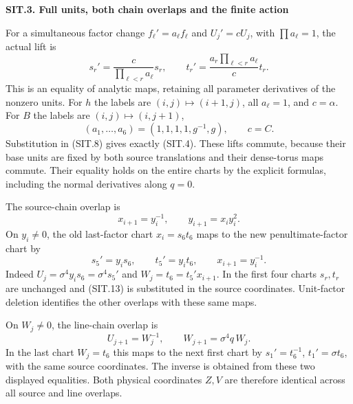 \par

\medskip\noindent\textbf{SIT.3. Full units, both chain overlaps and the finite action}

\par\nobreak

For a simultaneous factor change \(f_\ell'=a_\ell f_\ell\)
and \(U_j'=cU_j\), with \(\prod a_\ell=1\), the actual lift is
\[
 s_r'=\frac{c}{\prod_{\ell<r}a_\ell}s_r,\qquad
 t_r'=\frac{a_r\prod_{\ell<r}a_\ell}{c}t_r .
 \tag{SIT.11}
\]
This is an equality of analytic maps, retaining all parameter
derivatives of the nonzero units. For \(h\) the labels are
\((i,j)\mapsto(i+1,j)\), all \(a_\ell=1\), and \(c=\alpha\).
For \(B\) the labels are \((i,j)\mapsto(i,j+1)\),
\[
 (a_1,\ldots,a_6)=(1,1,1,1,g^{-1},g),\qquad c=C.
 \tag{SIT.12}
\]
Substitution in (SIT.8) gives exactly (SIT.4).
These lifts commute, because their base units are fixed by
both source translations and their dense-torus maps commute.
Their equality holds on the entire charts by the explicit
formulas, including the normal derivatives along \(q=0\).

The source-chain overlap is
\[
 x_{i+1}=y_i^{-1},\qquad y_{i+1}=x_i y_i^2.
 \tag{SIT.13}
\]
On \(y_i\ne0\), the old last-factor chart
\(x_i=s_6t_6\) maps to the new penultimate-factor chart by
\[
 s_5'=y_i s_6,\qquad t_5'=y_i t_6,\qquad x_{i+1}=y_i^{-1}.
 \tag{SIT.14}
\]
Indeed \(U_j=\sigma^4y_i s_6=\sigma^4s_5'\) and
\(W_j=t_6=t_5'x_{i+1}\). In the first four charts \(s_r,t_r\)
are unchanged and (SIT.13) is substituted in the source
coordinates. Unit-factor deletion identifies the other
overlaps with these same maps.

On \(W_j\ne0\), the line-chain overlap is
\[
 U_{j+1}=W_j^{-1},\qquad W_{j+1}=\sigma^4q\,W_j.
 \tag{SIT.15}
\]
In the last chart \(W_j=t_6\) this maps to the next first chart
by \(s_1'=t_6^{-1}\), \(t_1'=\sigma t_6\), with the same
source coordinates. The inverse is obtained from these two
displayed equalities. Both physical coordinates \(Z,V\) are
therefore identical across all source and line overlaps.

